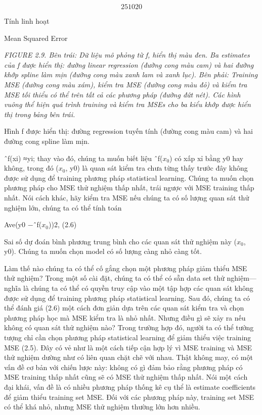 \[2 5 10 20\]

Tính linh hoạt

Mean Squared Error

\noindent\textit{FIGURE 2.9. Bên trái: Dữ liệu mô phỏng từ f, hiển thị màu đen. Ba estimates của f được hiển thị: đường linear regression (đường cong màu cam) và hai đường khớp spline làm mịn (đường cong màu xanh lam và xanh lục). Bên phải: Training MSE (đường cong màu xám), kiểm tra MSE (đường cong màu đỏ) và kiểm tra MSE tối thiểu có thể trên tất cả các phương pháp (đường đứt nét). Các hình vuông thể hiện quá trình training và kiểm tra MSEs cho ba kiểu khớp được hiển thị trong bảng bên trái.}

Hình f được hiển thị: đường regression tuyến tính (đường cong màu cam) và hai đường cong spline làm mịn.

ˆf(xi) ≈yi; thay vào đó, chúng ta muốn biết liệu ˆf($x_{0}$) có xấp xỉ bằng y0 hay không, trong đó ($x_{0}$, y0) là quan sát kiểm tra chưa từng thấy trước đây không được sử dụng để training phương pháp statistical learning. Chúng ta muốn chọn phương pháp cho MSE thử nghiệm thấp nhất, trái ngược với MSE training thấp nhất. Nói cách khác, hãy kiểm tra MSE nếu chúng ta có số lượng quan sát thử nghiệm lớn, chúng ta có thể tính toán

Ave(y0 −ˆf($x_{0}$))2, (2.6)

Sai số dự đoán bình phương trung bình cho các quan sát thử nghiệm này ($x_{0}$, y0). Chúng ta muốn chọn model có số lượng càng nhỏ càng tốt.

Làm thế nào chúng ta có thể cố gắng chọn một phương pháp giảm thiểu MSE thử nghiệm? Trong một số cài đặt, chúng ta có thể có sẵn data set thử nghiệm—nghĩa là chúng ta có thể có quyền truy cập vào một tập hợp các quan sát không được sử dụng để training phương pháp statistical learning. Sau đó, chúng ta có thể đánh giá (2.6) một cách đơn giản dựa trên các quan sát kiểm tra và chọn phương pháp học mà MSE kiểm tra là nhỏ nhất. Nhưng điều gì sẽ xảy ra nếu không có quan sát thử nghiệm nào? Trong trường hợp đó, người ta có thể tưởng tượng chỉ cần chọn phương pháp statistical learning để giảm thiểu việc training MSE (2.5). Đây có vẻ như là một cách tiếp cận hợp lý vì MSE training và MSE thử nghiệm dường như có liên quan chặt chẽ với nhau. Thật không may, có một vấn đề cơ bản với chiến lược này: không có gì đảm bảo rằng phương pháp có MSE training thấp nhất cũng sẽ có MSE thử nghiệm thấp nhất. Nói một cách đại khái, vấn đề là có nhiều phương pháp thống kê cụ thể là estimate coefficients để giảm thiểu training set MSE. Đối với các phương pháp này, training set MSE có thể khá nhỏ, nhưng MSE thử nghiệm thường lớn hơn nhiều.

